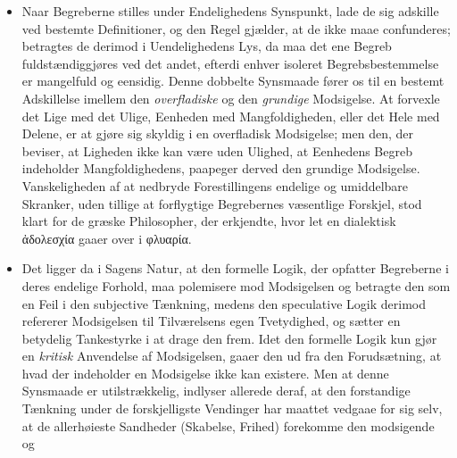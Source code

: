 \documentclass[12pt]{book}
\newcommand{\opage}[1]{\marginnote{\footnotesize\textit{[#1]}}}
\begin{document}
\begin{itemize}
\item[a)] Naar Begreberne stilles under Endelighedens Synspunkt, lade de sig
  adskille ved bestemte Definitioner, og den Regel gjælder, at de ikke maae
  confunderes; betragtes de derimod i Uendelighedens Lys, da maa det ene Begreb
  fuldstændiggjøres ved det andet, efterdi enhver isoleret Begrebsbestemmelse er
  mangelfuld og eensidig. Denne dobbelte Synsmaade fører os til en bestemt
  Adskillelse imellem den \emph{overfladiske} og den \emph{grundige} Modsigelse.
  At forvexle det Lige med det Ulige, Eenheden med Mangfoldigheden, eller det
  Hele med Delene, er at gjøre sig skyldig i en overfladisk Modsigelse; men den,
  der beviser, at Ligheden ikke kan
  \opage{44} være uden Ulighed, at Eenhedens Begreb indeholder Mangfoldighedens, paapeger
  derved den grundige Modsigelse. Vanskeligheden af at nedbryde Forestillingens
  endelige og umiddelbare Skranker, uden tillige at forflygtige Begrebernes
  væsentlige Forskjel, stod klart for de græske Philosopher, der erkjendte, hvor
  let en dialektisk ἀδολεσχία gaaer over i φλυαρία.
\item[b)] Det ligger da i Sagens Natur, at den formelle Logik, der opfatter
  Begreberne i deres endelige Forhold, maa polemisere mod Modsigelsen og
  betragte den som en Feil i den subjective Tænkning, medens den speculative
  Logik derimod refererer Modsigelsen til Tilværelsens egen Tvetydighed, og
  sætter en betydelig Tankestyrke i at drage den frem. Idet den formelle Logik
  kun gjør en \emph{kritisk} Anvendelse af Modsigelsen, gaaer den ud fra den
  Forudsætning, at hvad der indeholder en Modsigelse ikke kan existere. Men at
  denne Synsmaade er utilstrækkelig, indlyser allerede deraf, at den forstandige
  Tænkning under de forskjelligste Vendinger har maattet vedgaae for sig selv,
  at de allerhøieste Sandheder (Skabelse, Frihed) forekomme den modsigende og

\end{itemize}
\end{document}
